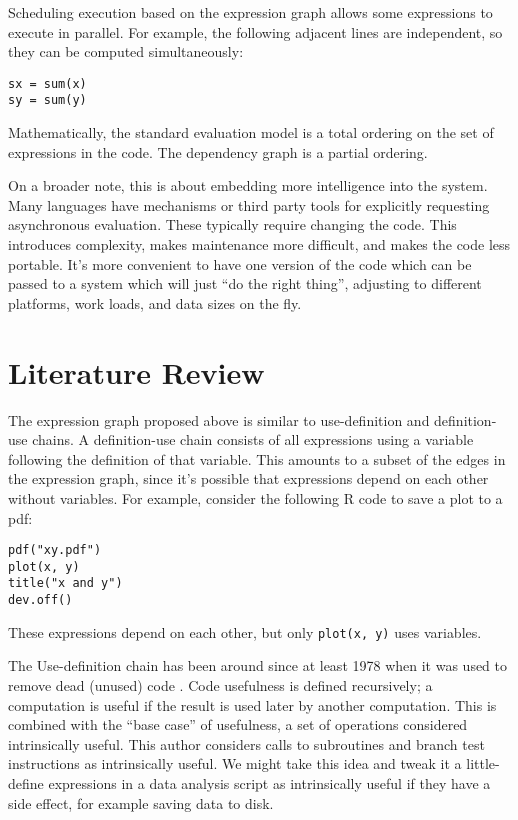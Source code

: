 \documentclass[12pt]{article}
\begin{document}
Scheduling execution based on the expression graph allows some expressions to execute in
parallel. For example, the following adjacent lines are independent, so
they can be computed simultaneously:

\begin{verbatim}
sx = sum(x)
sy = sum(y)
\end{verbatim}

Mathematically, the standard evaluation model is a total ordering on the
set of expressions in the code. The dependency graph is a partial ordering.

On a broader note, this is about embedding more intelligence into the 
system. Many languages have mechanisms or third party tools for explicitly
requesting asynchronous evaluation. These typically require changing the
code. This introduces complexity, makes maintenance more difficult, and
makes the code less portable.  It's more convenient to have one version of
the code which can be passed to a system which will just ``do the right
thing'', adjusting to different platforms, work loads, and data sizes on
the fly. 

\section{Literature Review}
\label{sec:lit}

The expression graph proposed above is similar to 
use-definition and definition-use chains. A definition-use chain consists
of all expressions using a variable following the definition of that
variable. This amounts to a subset of the edges in the expression graph,
since it's possible that expressions depend on each other without
variables. For example, consider the following R code to save a plot to a
pdf:
\begin{verbatim}
pdf("xy.pdf")
plot(x, y)
title("x and y")
dev.off()
\end{verbatim}
These expressions depend on each other, but only \texttt{plot(x, y)} uses variables.

The Use-definition chain has been around since at least 1978
when it was used to remove dead (unused) code \cite{kennedy1978use}.
Code usefulness is defined recursively; a computation is useful if the result is
used later by another computation. This is combined with the ``base case''
of usefulness, a set of operations considered
intrinsically useful. This author considers calls to subroutines and branch
test instructions as intrinsically useful. We might take this idea and
tweak it a little- define expressions in a data analysis script as
intrinsically useful if they have a side effect, for example
saving data to disk.
\end{document}
